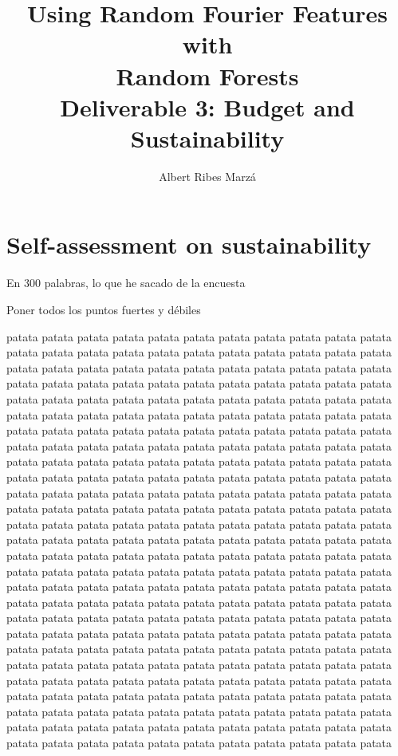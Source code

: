\documentclass[a4paper]{article}
\title{
Using Random Fourier Features with \\ Random Forests \\
\large Deliverable 3: Budget and Sustainability}
\author{Albert Ribes Marzá}
\begin{document}
    \maketitle
    \pagebreak

    \tableofcontents
    \pagebreak


    \section{Self-assessment on sustainability}
    En 300 palabras, lo que he sacado de la encuesta

    Poner todos los puntos fuertes y débiles


patata patata patata patata patata patata patata patata patata patata patata
patata patata patata patata patata patata patata patata patata patata patata
patata patata patata patata patata patata patata patata patata patata patata
patata patata patata patata patata patata patata patata patata patata patata
patata patata patata patata patata patata patata patata patata patata patata
patata patata patata patata patata patata patata patata patata patata patata
patata patata patata patata patata patata patata patata patata patata patata
patata patata patata patata patata patata patata patata patata patata patata
patata patata patata patata patata patata patata patata patata patata patata
patata patata patata patata patata patata patata patata patata patata patata
patata patata patata patata patata patata patata patata patata patata patata
patata patata patata patata patata patata patata patata patata patata patata
patata patata patata patata patata patata patata patata patata patata patata
patata patata patata patata patata patata patata patata patata patata patata
patata patata patata patata patata patata patata patata patata patata patata
patata patata patata patata patata patata patata patata patata patata patata
patata patata patata patata patata patata patata patata patata patata patata
patata patata patata patata patata patata patata patata patata patata patata
patata patata patata patata patata patata patata patata patata patata patata
patata patata patata patata patata patata patata patata patata patata patata
patata patata patata patata patata patata patata patata patata patata patata
patata patata patata patata patata patata patata patata patata patata patata
patata patata patata patata patata patata patata patata patata patata patata
patata patata patata patata patata patata patata patata patata patata patata
patata patata patata patata patata patata patata patata patata patata patata
patata patata patata patata patata patata patata patata patata patata patata
patata patata patata patata patata patata patata patata patata patata patata
\end{document}
